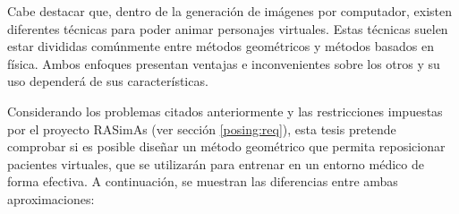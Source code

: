  
Cabe destacar que, dentro de la generación de imágenes por computador, existen diferentes técnicas para poder animar personajes virtuales.
Estas técnicas suelen estar divididas comúnmente entre métodos geométricos y métodos basados en física. Ambos enfoques presentan ventajas e inconvenientes sobre los otros y su uso dependerá de sus características. 

Considerando los problemas citados anteriormente y las restricciones impuestas por el proyecto \ac{RASimAs} (ver sección \ref{posing:req}), esta tesis pretende comprobar si es posible diseñar un método geométrico que permita reposicionar pacientes virtuales, que se utilizarán para entrenar en un entorno médico de forma efectiva. A continuación, se muestran las diferencias entre ambas aproximaciones:

